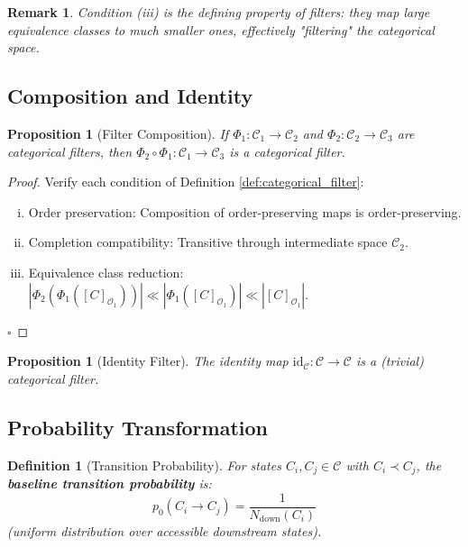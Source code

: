 \documentclass[12pt,a4paper]{article}
\newtheorem{proposition}[theorem]{Proposition}
\newtheorem{definition}[theorem]{Definition}
\newtheorem{remark}[theorem]{Remark}
\begin{document}
\begin{remark}
Condition (iii) is the defining property of filters: they map large equivalence classes to much smaller ones, effectively "filtering" the categorical space.
\end{remark}

\subsection{Composition and Identity}

\begin{proposition}[Filter Composition]
\label{prop:filter_composition}
If $\Phi_1: \mathcal{C}_1 \to \mathcal{C}_2$ and $\Phi_2: \mathcal{C}_2 \to \mathcal{C}_3$ are categorical filters, then $\Phi_2 \circ \Phi_1: \mathcal{C}_1 \to \mathcal{C}_3$ is a categorical filter.
\end{proposition}

\begin{proof}
Verify each condition of Definition \ref{def:categorical_filter}:
\begin{enumerate}[(i)]
\item Order preservation: Composition of order-preserving maps is order-preserving.
\item Completion compatibility: Transitive through intermediate space $\mathcal{C}_2$.
\item Equivalence class reduction: $|\Phi_2(\Phi_1([C]_{\mathcal{O}_1}))| \ll |\Phi_1([C]_{\mathcal{O}_1})| \ll |[C]_{\mathcal{O}_1}|$.
\end{enumerate}
$\square$
\end{proof}

\begin{proposition}[Identity Filter]
\label{prop:identity_filter}
The identity map $\text{id}_{\mathcal{C}}: \mathcal{C} \to \mathcal{C}$ is a (trivial) categorical filter.
\end{proposition}

\subsection{Probability Transformation}

\begin{definition}[Transition Probability]
\label{def:transition_probability}
For states $C_i, C_j \in \mathcal{C}$ with $C_i \prec C_j$, the \textbf{baseline transition probability} is:
\begin{equation}
p_0(C_i \to C_j) = \frac{1}{N_{\text{down}}(C_i)}
\end{equation}
(uniform distribution over accessible downstream states).
\end{definition}
\end{document}
